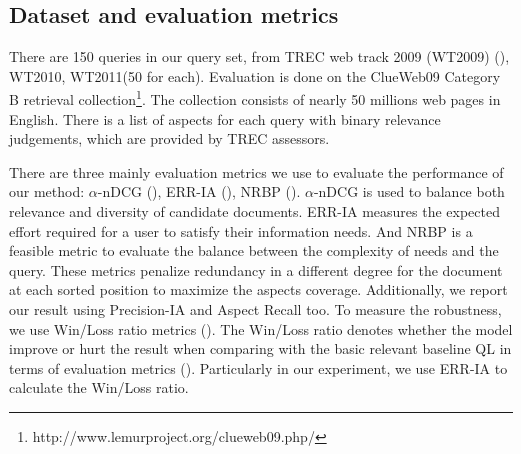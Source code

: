 \documentclass[review]{elsarticle}
\newcommand\revised[1]{{\color{black} #1}}
\begin{document}
\subsection{Dataset and evaluation metrics}
There are 150 queries in our query set, from TREC web track 2009 (WT2009) (\cite{clarke2009preliminary}), WT2010, WT2011(50 for each). Evaluation is done on the ClueWeb09 Category B retrieval collection\footnote{http://www.lemurproject.org/clueweb09.php/}. The collection consists of nearly 50 millions web pages in English. There is a list of aspects for each query with binary relevance judgements, which are provided by TREC assessors.






\revised{
	There are three mainly evaluation metrics we use to evaluate the performance of our method: $\alpha$-nDCG (\cite{clarke2008novelty}), ERR-IA (\cite{chapelle2009expected}), NRBP (\cite{clarke2009effectiveness}). 
	$\alpha$-nDCG is used to balance both relevance and diversity of candidate documents. ERR-IA measures the expected effort required for a user to satisfy their information needs. And NRBP is a feasible metric to evaluate the balance between the complexity of needs and the query.
	These metrics penalize redundancy in a different degree for the document at each sorted position to maximize the aspects coverage. Additionally, we report our result using Precision-IA  and Aspect Recall too. To measure the robustness, we use Win/Loss ratio metrics (\cite{yue2008predicting,dang2012diversity}). The Win/Loss ratio denotes whether the model improve or hurt the result when comparing with the basic relevant baseline QL in terms of evaluation metrics (\cite{dang2012diversity}). Particularly in our experiment, we use ERR-IA to calculate the Win/Loss ratio.
	}
\end{document}
